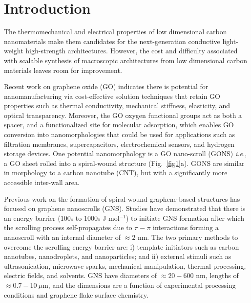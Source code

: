 \justifying
\section{Introduction}
The thermomechanical and electrical properties of low dimensional carbon nanomaterials make them candidates for the next-generation conductive light-weight high-strength architectures.\cite{Park2009,Liu2011,DeVolder2013,Cong2014} However, the cost and difficulty associated with scalable synthesis of macroscopic architectures from low dimensional carbon materials\cite{DeVolder2013,Cong2014} leaves room for improvement.

Recent work on graphene oxide (GO) indicates there is potential for nanomanufacturing via cost-effective solution techniques\cite{Cong2014,Aboutalebi2011,Kumar2014,Zheng2013,Jia2014} that retain GO properties\cite{Dikin2007,Dreyer2010,Liu2012} such as thermal conductivity,\cite{Balandin2011} mechanical stiffness,\cite{Lee2008} elasticity,\cite{Gomez2008} and optical transparency.\cite{Kim2009} Moreover, the GO oxygen functional groups act as both a spacer,\cite{Dikin2007,Sun2013,Han2013,Smith2014,Joshi2014} and a functionalized site for molecular adsorption,\cite{Stankovich2006,Mkhoyan2009} which enables GO conversion into nanomorphologies that could be used for applications such as filtration membranes,\cite{Han2013} supercapacitors,\cite{Zhang2010} electrochemical sensors,\cite{Shao2012} and hydrogen storage devices.\cite{Zou2010} One potential nanomorphology is a GO nano-scroll (GONS) \textit{i.e.}, a GO sheet rolled into a spiral-wound structure (Fig.~\ref{fig1}a). GONS are similar in morphology to a carbon nanotube (CNT), but with a significantly more accessible inter-wall area.

Previous work on the formation of spiral-wound graphene-based structures has focused on graphene nanoscrolls (GNS). Studies have demonstrated that there is an energy barrier (100s to 1000s J mol$^{-1}$) to initiate GNS formation after which the scrolling process self-propagates due to $\pi - \pi$ interactions forming a nanoscroll with an internal diameter of $\approx2$ nm.\cite{Braga2004,Chen2013,Patra2009,Kim2010} The two primary methods to overcome the scrolling energy barrier are: i) template initiators such as carbon nanotubes,\cite{Kim2010,Zhang2010,Xia2010,Perim2013,Wang2015,Calvaresi2013} nanodroplets,\cite{Calvaresi2013,Patra2009} and nanoparticles;\cite{Wang2012,Sharifi2013,Zhao2014,Zhao2014a} and ii) external stimuli such as ultrasonication,\cite{Wang2012,Calvaresi2013,Viculis2003,Roy2008} microwave sparks,\cite{Zheng2011} mechanical manipulation,\cite{Chen2013,Li2005,Gao2010,Li2013} thermal processing,\cite{Wang2015,Zhao2014,Zhao2014a} electric fields,\cite{Sidorov2009} and solvents.\cite{Savoskin2007,Xie2009} GNS have diameters of $\approx 20 - 600$ nm,\cite{Li2005,Savoskin2007,Roy2008,Zhao2014,Kim2010,Zheng2011,Wang2012} lengths of $\approx 0.7 - 10\ \mu$m,\cite{Li2005,Savoskin2007,Kim2010,Zheng2011,Wang2012} and the dimensions are a function of experimental processing conditions and graphene flake surface chemistry.

